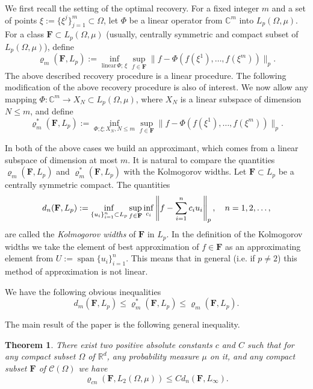 \documentclass[12pt]{article}
\def\C{{\mathcal C}}
\def\R{{\mathbb R}}
\def\bbC{\mathbb C}
\def\Og{\Omega}
\def \ro{\varrho}
\def \sp{\operatorname{span}}
\def\bF{\mathbf F}
\def\Og{\Omega}
\newtheorem{Theorem}{Theorem}[section]
\numberwithin{equation}{section}
\newcommand{\be}{\begin{equation}}
\newcommand{\ee}{\end{equation}}
\begin{document}
We first recall the setting 
 of the optimal recovery. For a fixed integer $m$ and a set of points  $\xi:=\{\xi^j\}_{j=1}^m\subset \Omega$, let $\Phi$ be a linear operator from $\bbC^m$ into $L_p(\Omega,\mu)$.
For a class $\bF\subset L_p(\Og, \mu)$ (usually, centrally symmetric and compact subset of $L_p(\Omega,\mu)$), define
$$
\varrho_m(\bF,L_p) := \inf_{\text{linear}\, \Phi; \,\xi} \sup_{f\in \bF} \|f-\Phi(f(\xi^1),\dots,f(\xi^m))\|_p.
$$
The above described recovery procedure is a linear procedure. 
The following modification of the above recovery procedure is also of interest. We now allow any mapping $\Phi : \bbC^m \to X_N \subset L_p(\Omega,\mu)$, where $X_N$ is a linear subspace of dimension $N\le m$,  and define
$$
\varrho_m^*(\bF,L_p) := \inf_{\Phi; \xi; X_N, N\le m} \sup_{f\in \bF}\|f-\Phi(f(\xi^1),\dots,f(\xi^m))\|_p.
$$

In both of the above cases we build an approximant, which comes from a linear subspace of dimension at most $m$. 
It is natural to compare the  quantities $\varrho_m(\bF,L_p)$ and $\varrho_m^*(\bF,L_p)$ with the 
Kolmogorov widths. Let $\bF\subset L_p$ be a centrally symmetric compact. The quantities  
$$
d_n (\bF, L_p) := \operatornamewithlimits{inf}_{\{u_i\}_{i=1}^n\subset L_p}
\sup_{f\in \bF}
\operatornamewithlimits{inf}_{c_i} \left \| f - \sum_{i=1}^{n}
c_i u_i \right\|_p, \quad n = 1, 2, \dots,
$$
are called the {\it Kolmogorov widths} of $\bF$ in $L_p$. In the definition of
the Kolmogorov widths we take the element of best
approximation of $f\in \bF$ as an approximating element
from $U := \sp \{u_i \}_{i=1}^n$.  This means
that in general (i.e. if $p\neq 2$) this method of approximation is not linear.

We have the following obvious inequalities
\be\label{I1}
d_m (\bF, L_p)\le \varrho_m^*(\bF,L_p)\le \varrho_m(\bF,L_p).
\ee

The main result of the paper \cite{VT183} is the following general inequality.
\begin{Theorem}\label{srT1}  There exist two positive absolute constants $c$ and $C$ such that for any   compact subset $\Omega$  of $\R^d$, any probability measure $\mu$ on it, and any compact subset $\bF$ of $\C(\Omega)$ we have
$$
\ro_{cn}(\bF,L_2(\Omega,\mu)) \le Cd_n(\bF,L_\infty).
$$
\end{Theorem}
\end{document}
